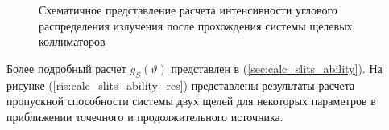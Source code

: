  \begin{figure}[H]
   \centering
   \hfill
   \caption{Схематичное представление расчета интенсивности углового
   распределения излучения после прохождения системы щелевых коллиматоров}
   \label{ris:how_many_quants_use_parallelogr}
 \end{figure}
Более подробный расчет  $g_S(\vartheta)$ представлен в (\ref{sec:calc_slits_ability}).
На рисунке (\ref{ris:calc_slits_ability_res}) представлены результаты расчета пропускной способности системы двух щелей для некоторых параметров в
приближении точечного и продолжительного источника.

